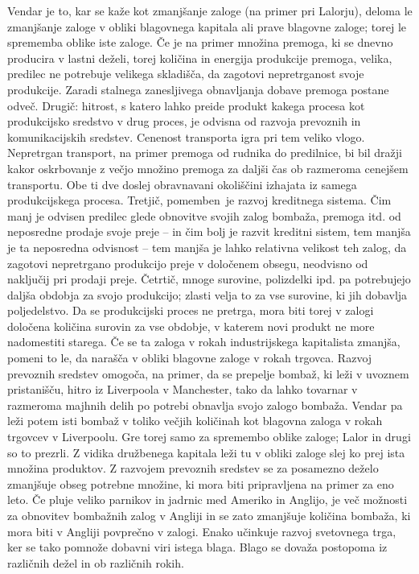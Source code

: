 \documentclass[kapital_02.tex]{subfiles}
\begin{document}
Vendar je to, kar se kaže kot zmanjšanje zaloge (na primer pri Lalorju), deloma le zmanjšanje zaloge v obliki blagovnega kapitala ali prave blagovne zaloge; torej le sprememba oblike iste zaloge.
Če je na primer množina premoga, ki se dnevno producira v lastni deželi, torej količina in energija produkcije premoga, velika, predilec ne potrebuje velikega skladišča, da zagotovi nepretrganost svoje produkcije.
Zaradi stalnega zanesljivega obnavljanja dobave premoga postane odveč.
Drugič: hitrost, s katero lahko preide produkt kakega procesa kot produkcijsko sredstvo v drug proces, je odvisna od razvoja prevoznih in komunikacijskih sredstev.
Cenenost transporta igra pri tem veliko vlogo.
Nepretrgan transport, na primer premoga od rudnika do predilnice, bi bil dražji kakor oskrbovanje z večjo množino premoga za daljši čas ob razmeroma cenejšem transportu.
Obe ti dve doslej obravnavani okoliščini izhajata iz samega produkcijskega procesa.
Tretjič, pomemben\KPEstran\ je razvoj kreditnega sistema.
Čim manj je odvisen predilec glede obnovitve svojih zalog bombaža, premoga itd. od neposredne prodaje svoje preje -- in čim bolj je razvit kreditni sistem, tem manjša je ta neposredna odvisnost -- tem manjša je lahko relativna velikost teh zalog, da zagotovi nepretrgano produkcijo preje v določenem obsegu, neodvisno od naključij pri prodaji preje.
Četrtič, mnoge surovine, polizdelki ipd. pa potrebujejo daljša obdobja za svojo produkcijo; zlasti velja to za vse surovine, ki jih dobavlja poljedelstvo.
Da se produkcijski proces ne pretrga, mora biti torej v zalogi določena količina surovin za vse obdobje, v katerem novi produkt ne more nadomestiti starega.
Če se ta zaloga v rokah industrijskega kapitalista zmanjša, pomeni to le, da narašča v obliki blagovne zaloge v rokah trgovca.
Razvoj prevoznih sredstev omogoča, na primer, da se prepelje bombaž, ki leži v uvoznem pristanišču, hitro iz Liverpoola v Manchester, tako da lahko tovarnar v razmeroma majhnih delih po potrebi obnavlja svojo zalogo bombaža.
Vendar pa leži potem isti bombaž v toliko večjih količinah kot blagovna zaloga v rokah trgovcev v Liverpoolu.
Gre torej samo za spremembo oblike zaloge; Lalor in drugi so to prezrli.
Z vidika družbenega kapitala leži tu v obliki zaloge slej ko prej ista množina produktov.
Z razvojem prevoznih sredstev se za posamezno deželo zmanjšuje obseg potrebne množine, ki mora biti pripravljena na primer za eno leto.
Če pluje veliko parnikov in jadrnic med Ameriko in Anglijo, je več možnosti za obnovitev bombažnih zalog v Angliji in se zato zmanjšuje količina bombaža, ki mora biti v Angliji povprečno v zalogi.
Enako učinkuje razvoj svetovnega trga, ker se tako pomnože dobavni viri istega blaga.
Blago se dovaža postopoma iz različnih dežel in ob različnih rokih.
\end{document}
